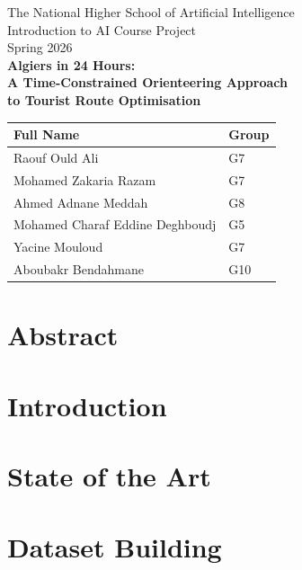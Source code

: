 \documentclass[11pt, a4paper]{article}
\begin{document}
\sloppy

\begin{titlepage}
  \centering
  \vspace*{1cm}
  {\large The National Higher School of Artificial Intelligence\\[4pt]
   Introduction to AI Course Project\\[4pt]
   Spring 2026}\\[2cm]
  {\LARGE\bfseries Algiers in 24 Hours:\\[6pt]
   A Time-Constrained Orienteering Approach\\
   to Tourist Route Optimisation}\\[2cm]
  {\Large
  \renewcommand{\arraystretch}{1.8}
  \begin{tabular}{|p{9cm}|p{3.5cm}|}
    \hline
    \textbf{Full Name} & \textbf{Group} \\
    \hline
    Raouf Ould Ali               & G7  \\
    \hline
    Mohamed Zakaria Razam        & G7  \\
    \hline
    Ahmed Adnane Meddah          & G8  \\
    \hline
    Mohamed Charaf Eddine Deghboudj & G5 \\
    \hline
    Yacine Mouloud               & G7  \\
    \hline
    Aboubakr Bendahmane          & G10 \\
    \hline
  \end{tabular}}
\end{titlepage}

\newpage
\section*{Abstract}


\section{Introduction}


\section{State of the Art}


\section{Dataset Building}

\end{document}
